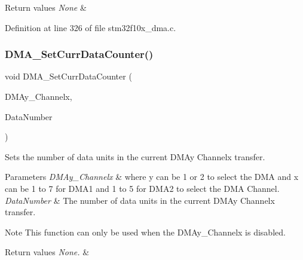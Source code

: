 \begin{DoxyRetVals}{Return values}
{\em None} & \\
\hline
\end{DoxyRetVals}


Definition at line 326 of file stm32f10x\+\_\+dma.\+c.

\mbox{\label{group___d_m_a___exported___functions_gade5d9e532814eaa46514cb385fdff709}} 
\subsubsection{\texorpdfstring{D\+M\+A\+\_\+\+Set\+Curr\+Data\+Counter()}{DMA\_SetCurrDataCounter()}}
{\footnotesize\ttfamily void D\+M\+A\+\_\+\+Set\+Curr\+Data\+Counter (\begin{DoxyParamCaption}\item[{\hyperlink{struct_d_m_a___channel___type_def}{D\+M\+A\+\_\+\+Channel\+\_\+\+Type\+Def} $\ast$}]{D\+M\+Ay\+\_\+\+Channelx,  }\item[{uint16\+\_\+t}]{Data\+Number }\end{DoxyParamCaption})}



Sets the number of data units in the current D\+M\+Ay Channelx transfer. 


\begin{DoxyParams}{Parameters}
{\em D\+M\+Ay\+\_\+\+Channelx} & where y can be 1 or 2 to select the D\+MA and x can be 1 to 7 for D\+M\+A1 and 1 to 5 for D\+M\+A2 to select the D\+MA Channel. \\
\hline
{\em Data\+Number} & The number of data units in the current D\+M\+Ay Channelx transfer. \\
\hline
\end{DoxyParams}
\begin{DoxyNote}{Note}
This function can only be used when the D\+M\+Ay\+\_\+\+Channelx is disabled. 
\end{DoxyNote}

\begin{DoxyRetVals}{Return values}
{\em None.} & \\
\hline
\end{DoxyRetVals}


